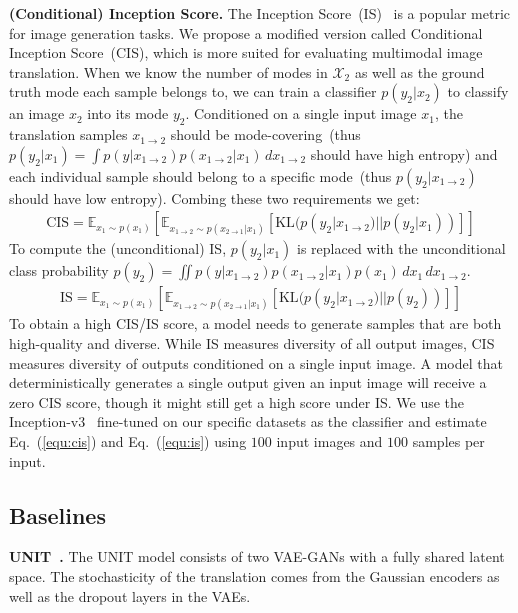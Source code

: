 \documentclass[runningheads]{llncs}
\newcommand{\vpara}[1]{\vspace{0.05in}\noindent\textbf{#1}}
\begin{document}
	\vpara{(Conditional) Inception Score.} The Inception Score~(IS)~\cite{salimans2016improved} is a popular metric for image generation tasks. We propose a modified version called Conditional Inception Score~(CIS), which is more suited for evaluating multimodal image translation. When we know the number of modes in $\mathcal{X}_{2}$ as well as the ground truth mode each sample belongs to, we can train a classifier $p(y_{2}|x_{2})$ to classify an image $x_{2}$ into its mode $y_{2}$. Conditioned on a single input image $x_{1}$, the translation samples $x_{1\rightarrow 2}$ should be mode-covering~(thus $p(y_2|x_{1})= \int p(y|x_{1\rightarrow 2})p(x_{1\rightarrow 2}|x_{1}) \,dx_{1\rightarrow 2}$ should have high entropy) and each individual sample should belong to a specific mode~(thus $p(y_{2}|x_{1\rightarrow 2})$ should have low entropy). Combing these two requirements we get:
	\begin{align}
	\text{CIS} = \mathbb{E}_{x_{1}\sim p(x_{1})}[ \mathbb{E}_{x_{1\rightarrow 2}\sim p(x_{2\rightarrow 1}|x_{1})} [\text{KL}(p(y_{2}|x_{1\rightarrow 2})||p(y_{2}|x_{1}))]]
	\label{equ:cis}
	\end{align} 
	To compute the (unconditional) IS, $p(y_{2}|x_{1})$ is replaced with the unconditional class probability $p(y_{2})= \iint p(y|x_{1\rightarrow 2})p(x_{1\rightarrow 2}|x_{1})p(x_{1}) \,dx_{1}\,dx_{1\rightarrow 2}$. 
	\begin{align}
	\text{IS} = \mathbb{E}_{x_{1}\sim p(x_{1})}[ \mathbb{E}_{x_{1\rightarrow 2}\sim p(x_{2\rightarrow 1}|x_{1})} [\text{KL}(p(y_{2}|x_{1\rightarrow 2})||p(y_{2}))]]
	\label{equ:is}
	\end{align} 
	To obtain a high CIS/IS score, a model needs to generate samples that are both high-quality and diverse. While IS measures diversity of all output images, CIS measures diversity of outputs conditioned on a single input image. A model that deterministically generates a single output given an input image will receive a zero CIS score, though it might still get a high score under IS. We use the Inception-v3~\cite{szegedy2016rethinking} fine-tuned on our specific datasets as the classifier and estimate Eq.~(\ref{equ:cis}) and Eq.~(\ref{equ:is}) using $100$ input images and $100$ samples per input. 


	
\subsection{Baselines}
\vpara{UNIT~\cite{liu2017unsupervised}.} The UNIT model consists of two VAE-GANs with a fully shared latent space. The stochasticity of the translation comes from the Gaussian encoders as well as the dropout layers in the VAEs.
	
\end{document}
